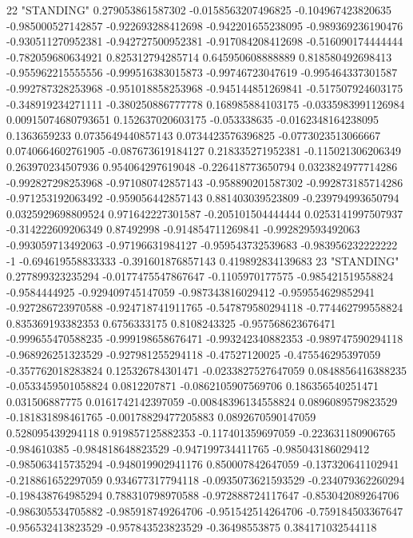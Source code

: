 22 "STANDING" 0.279053861587302 -0.0158563207496825 -0.104967423820635 -0.985000527142857 -0.922693288412698 -0.942201655238095 -0.989369236190476 -0.930511270952381 -0.942727500952381 -0.917084208412698 -0.516090174444444 -0.782059680634921 0.825312794285714 0.645950608888889 0.818580492698413 -0.955962215555556 -0.999516383015873 -0.99746723047619 -0.995464337301587 -0.992787328253968 -0.951018858253968 -0.945144851269841 -0.517507924603175 -0.348919234271111 -0.380250886777778 0.168985884103175 -0.0335983991126984 0.00915074680793651 0.152637020603175 -0.053338635 -0.0162348164238095 0.1363659233 0.0735649440857143 0.0734423576396825 -0.0773023513066667 0.0740664602761905 -0.087673619184127 0.218335271952381 -0.115021306206349 0.263970234507936 0.954064297619048 -0.226418773650794 0.0323824977714286 -0.992827298253968 -0.971080742857143 -0.958890201587302 -0.992873185714286 -0.971253192063492 -0.959056442857143 0.881403039523809 -0.239794993650794 0.0325929698809524 0.971642227301587 -0.205101504444444 0.0253141997507937 -0.314222609206349 0.87492998 -0.914854711269841 -0.992829593492063 -0.993059713492063 -0.97196631984127 -0.959543732539683 -0.983956232222222 -1 -0.694619558833333 -0.391601876857143 0.419892834139683
23 "STANDING" 0.277899323235294 -0.0177475547867647 -0.1105970177575 -0.985421519558824 -0.9584444925 -0.929409745147059 -0.987343816029412 -0.959554629852941 -0.927286723970588 -0.924718741911765 -0.547879580294118 -0.774462799558824 0.835369193382353 0.6756333175 0.8108243325 -0.957568623676471 -0.999655470588235 -0.999198658676471 -0.993242340882353 -0.989747590294118 -0.968926251323529 -0.927981255294118 -0.47527120025 -0.475546295397059 -0.357762018283824 0.125326784301471 -0.0233827527647059 0.0848856416388235 -0.0533459501058824 0.0812207871 -0.0862105907569706 0.186356540251471 0.031506887775 0.0161742142397059 -0.00848396134558824 0.0896089579823529 -0.181831898461765 -0.00178829477205883 0.0892670590147059 0.528095439294118 0.919857125882353 -0.117401359697059 -0.223631180906765 -0.984610385 -0.984818648823529 -0.947199734411765 -0.985043186029412 -0.985063415735294 -0.948019902941176 0.850007842647059 -0.137320641102941 -0.218861652297059 0.934677317794118 -0.0935073621593529 -0.234079362260294 -0.198438764985294 0.788310798970588 -0.972888724117647 -0.853042089264706 -0.986305534705882 -0.985918749264706 -0.951542514264706 -0.759184503367647 -0.956532413823529 -0.957843523823529 -0.36498553875 0.384171032544118
